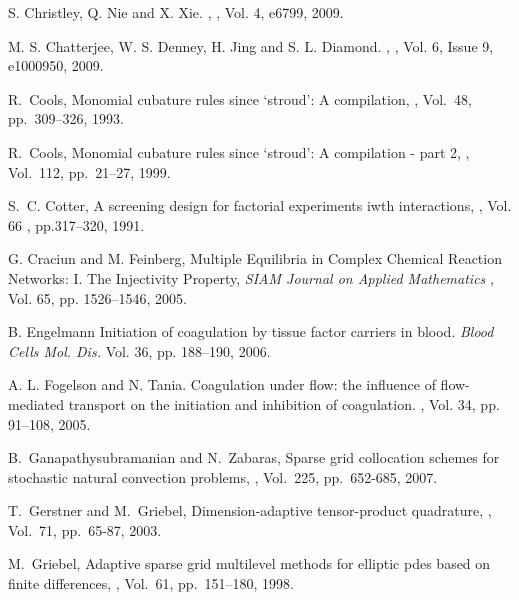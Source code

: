 \begin{thebibliography}{99}
\newblock S. Christley, Q. Nie and X. Xie. , ,
Vol. 4, e6799, 2009.

\newblock M. S. Chatterjee, W. S. Denney, H. Jing and S. L. Diamond.
,
, Vol. 6, Issue 9, e1000950, 2009.

\newblock R.~Cools, \newblock Monomial cubature rules since `stroud': A compilation, , Vol.~48, pp.~309--326, 1993.

\newblock R.~Cools, \newblock Monomial cubature rules since `stroud': A compilation - part
2,
, Vol.~112, pp.~21--27, 1999.


\newblock S.~C. Cotter, \newblock A screening design for factorial experiments iwth interactions,
, Vol. 66 , pp.317--320, 1991.

 G. Craciun and M. Feinberg, \newblock Multiple Equilibria in Complex Chemical Reaction Networks: I. The Injectivity Property, {\em SIAM Journal on  Applied Mathematics }, Vol. 65, pp.
1526--1546, 2005.

\newblock B. Engelmann  \newblock Initiation of coagulation by tissue factor
carriers in blood. {\em Blood Cells Mol. Dis. } Vol. 36, pp.
188--190, 2006.

A. L. Fogelson and N. Tania.
\newblock Coagulation under flow: the influence of flow-mediated transport on the initiation and inhibition of coagulation.
, Vol. 34, pp. 91--108, 2005.


\newblock B.~Ganapathysubramanian and N.~Zabaras, \newblock Sparse grid collocation schemes for
\newblock  stochastic natural convection problems, , Vol.~225, pp.~652-685, 2007.

\newblock T.~Gerstner and M.~Griebel, \newblock Dimension-adaptive tensor-product
quadrature,
 , Vol.~71, pp.~65-87, 2003.


\newblock M.~Griebel, \newblock Adaptive sparse grid multilevel methods for elliptic pdes based
\newblock   on finite differences, , Vol.~61,  pp.~151--180, 1998.


\end{thebibliography}
